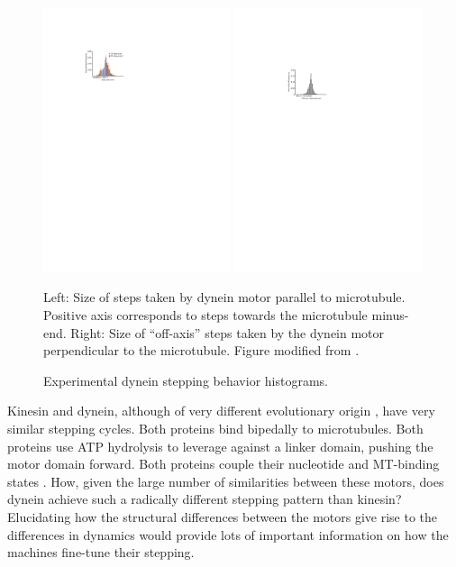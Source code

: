\documentclass[
11pt, %
english, %
singlespacing, %
headsepline, %
chapterinoneline, %
]{MastersDoctoralThesis} %
\begin{document}
\begin{figure}[h!]
  \centering
  \includegraphics[width=0.49\textwidth]{../../figures/weihong-step-size}
  \includegraphics[width=0.49\textwidth]{../../figures/weihong-off-axis-steps}
    \caption{Experimental dynein stepping behavior histograms.}{Left: Size of steps taken by dynein motor parallel to microtubule. Positive axis corresponds to steps towards the microtubule minus-end. Right: Size of ``off-axis'' steps taken by the dynein motor perpendicular to the microtubule. Figure modified from \cite{weihongpaper}.}
  \label{fig:weihong-steps}
\end{figure}

Kinesin and dynein, although of very different evolutionary origin \cite{hook-family}, have very similar stepping cycles. Both proteins bind bipedally to microtubules. Both proteins use ATP hydrolysis to leverage against a linker domain, pushing the motor domain forward. Both proteins couple their nucleotide and MT-binding states \cite{vale-kinesin-cycle}. How, given the large number of similarities between these motors, does dynein achieve such a radically different stepping pattern than kinesin? Elucidating how the structural differences between the motors give rise to the differences in dynamics would provide lots of important information on how the machines fine-tune their stepping.\\
\end{document}
